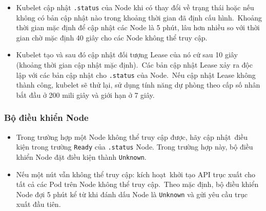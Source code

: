 \documentclass[12pt,a4paper]{report}
\begin{document}
	
	\begin{itemize}
		\item Kubelet cập nhật \texttt{.status} của Node khi có thay đổi về trạng thái hoặc nếu không có bản cập nhật nào trong khoảng thời gian đã định cấu hình. Khoảng thời gian mặc định để cập nhật các Node là 5 phút, lâu hơn nhiều so với thời gian chờ mặc định 40 giây cho các Node không thể truy cập.
		\item Kubelet tạo và sau đó cập nhật đối tượng Lease của nó cứ sau 10 giây (khoảng thời gian cập nhật mặc định). Các bản cập nhật Lease xảy ra độc lập với các bản cập nhật cho \texttt{.status} của Node. Nếu cập nhật Lease không thành công, kubelet sẽ thử lại, sử dụng tính năng dự phòng theo cấp số nhân bắt đầu ở 200 mili giây và giới hạn ở 7 giây.
	\end{itemize}
	\subsubsection{Bộ điều khiển Node}
	
	\hspace{1cm}{Bộ điều khiển Node là một thành phần control plane Kubernetes quản lý các khía cạnh khác nhau của các Node.\\}
	
	\hspace{0.3cm}{Bộ điều khiển Node có nhiều vai trò trong vòng đời của Node. Đầu tiên là gán một khối CIDR cho Node khi nó được đăng ký (nếu chức năng gán CIDR được bật).\\}
	
	\hspace{0.3cm}{Thứ hai là giữ cho danh sách các Node nội bộ của bộ điều khiển Node được cập nhật với danh sách các máy có sẵn của nhà cung cấp đám mây. Khi chạy trong môi trường đám mây và bất cứ khi nào một Node không hoạt động tốt, bộ điều khiển Node sẽ hỏi nhà cung cấp đám mây xem VM cho Node đó có còn khả dụng hay không. Nếu không, bộ điều khiển Node sẽ xóa Node đó khỏi danh sách các Node của nó.\\}
	
	\hspace{0.3cm}{	Thứ ba là theo dõi tình trạng của các Node. Bộ điều khiển Node chịu trách nhiệm:}
	
	\begin{itemize}
		\item Trong trường hợp một Node không thể truy cập được, hãy cập nhật điều kiện trong trường \texttt{Ready} của \texttt{.status} Node. Trong trường hợp này, bộ điều khiển Node đặt điều kiện thành \texttt{Unknown}.
		\item Nếu một nút vẫn không thể truy cập: kích hoạt khởi tạo API trục xuất cho tất cả các Pod trên Node không thể truy cập. Theo mặc định, bộ điều khiển Node đợi 5 phút kể từ khi đánh dấu Node là \texttt{Unknown} và gửi yêu cầu trục xuất đầu tiên.
	\end{itemize}
	
\end{document}
